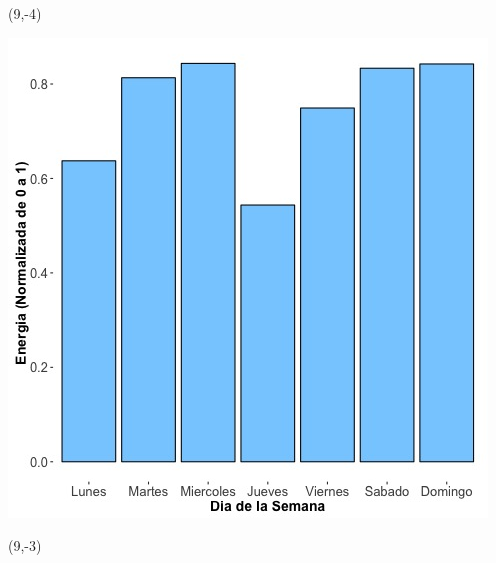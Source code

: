\documentclass{article}\usepackage[]{graphicx}\usepackage[]{color}
\newenvironment{knitrout}{}{} %
\begin{document}
 \begin{textblock}{1}(9,-4)
\begin{minipage}{20em}
\begingroup

\endgroup
\end{minipage}
\end{textblock}


\begin{knitrout}
\color{fgcolor}
\includegraphics[scale=0.65]{figure/A25_day_of_week_plot} 
\end{knitrout}


 \begin{textblock}{1}(9,-3)
\begin{minipage}{20em}
\begingroup

\endgroup
\end{minipage}
\end{textblock}
\end{document}
